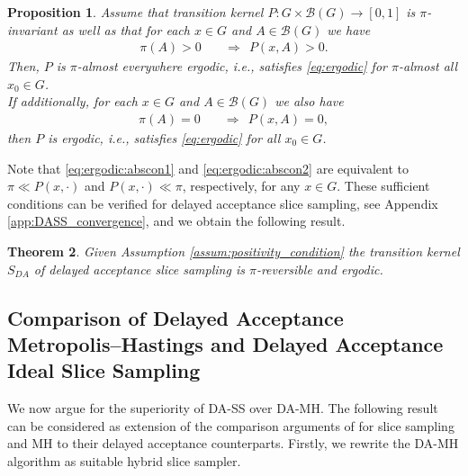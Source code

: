 \documentclass[sn-mathphys-num]{sn-jnl}%
\theoremstyle{thmstyleone}%
\newtheorem{theorem}{Theorem}%
\newtheorem{proposition}[theorem]{Proposition}%
\theoremstyle{thmstyletwo}%
\theoremstyle{thmstylethree}%
\begin{document}
\begin{proposition}
\label{Schaer:Convergence}
Assume that transition kernel $P\colon G \times \mathcal{B}(G)\to[0,1]$ is $\pi$-invariant as well as that for each $x\in G$ and $A\in \mathcal{B}(G)$ we have
\begin{align}\label{eq:ergodic:abscon1}
    \pi(A) > 0
    &\quad \Rightarrow \ \
    P(x,A) > 0.
\end{align}
Then, $P$ is $\pi$-almost everywhere ergodic, i.e., satisfies \eqref{eq:ergodic} for $\pi$-almost all $x_0 \in G$. \\
If additionally, for each $x\in G$ and $A\in \mathcal{B}(G)$ we also have
\begin{align}\label{eq:ergodic:abscon2} 
    \pi(A) = 0
    & \quad \Rightarrow \ \
    P(x,A) = 0,
\end{align}
then $P$ is ergodic, i.e., satisfies \eqref{eq:ergodic} for all $x_0 \in G$.
\end{proposition}

Note that \eqref{eq:ergodic:abscon1} and \eqref{eq:ergodic:abscon2} are equivalent to $\pi \ll P(x,\cdot)$ and $P(x,\cdot) \ll \pi$, respectively, for any $x\in G$.
These sufficient conditions can be verified for delayed acceptance slice sampling, see Appendix \ref{app:DASS_convergence}, and we obtain
the following result.


\begin{theorem}\label{DASS:Ergodicity}
    Given Assumption \ref{assum:positivity_condition} the transition kernel $S_{DA}$ of delayed acceptance slice sampling is $\pi$-reversible and ergodic.
\end{theorem}

\subsection{Comparison of Delayed Acceptance Metropolis--Hastings and Delayed Acceptance Ideal Slice Sampling}\label{sec:comparison}

We now argue for the superiority of DA-SS over DA-MH.
The following result can be considered as extension of the comparison arguments of \cite{RudolfUllrich2018} for slice sampling and MH to their delayed acceptance counterparts.
Firstly, we rewrite the DA-MH algorithm as suitable hybrid slice sampler. 
\end{document}
